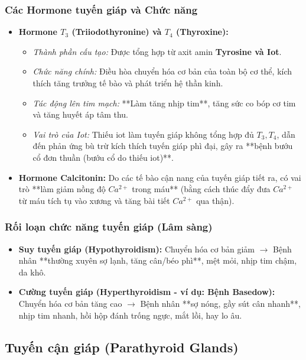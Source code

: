 \subsubsection{Các Hormone tuyến giáp và Chức năng}
\begin{itemize}
    \item \textbf{Hormone $T_3$ (Triiodothyronine) và $T_4$ (Thyroxine):}
    \begin{itemize}
        \item \textit{Thành phần cấu tạo:} Được tổng hợp từ axit amin \textbf{Tyrosine và Iot}.
        \item \textit{Chức năng chính:} Điều hòa chuyển hóa cơ bản của toàn bộ cơ thể, kích thích tăng trưởng tế bào và phát triển hệ thần kinh.
        \item \textit{Tác động lên tim mạch:} **Làm tăng nhịp tim**, tăng sức co bóp cơ tim và tăng huyết áp tâm thu.
        \item \textit{Vai trò của Iot:} Thiếu iot làm tuyến giáp không tổng hợp đủ $T_3, T_4$, dẫn đến phản ứng bù trừ kích thích tuyến giáp phì đại, gây ra **bệnh bướu cổ đơn thuần (bướu cổ do thiếu iot)**.
    \end{itemize}

    \item \textbf{Hormone Calcitonin:} Do các tế bào cận nang của tuyến giáp tiết ra, có vai trò **làm giảm nồng độ $Ca^{2+}$ trong máu** (bằng cách thúc đẩy đưa $Ca^{2+}$ từ máu tích tụ vào xương và tăng bài tiết $Ca^{2+}$ qua thận).
\end{itemize}

\subsubsection{Rối loạn chức năng tuyến giáp (Lâm sàng)}
\begin{itemize}
    \item \textbf{Suy tuyến giáp (Hypothyroidism):} Chuyển hóa cơ bản giảm $\rightarrow$ Bệnh nhân **thường xuyên sợ lạnh, tăng cân/béo phì**, mệt mỏi, nhịp tim chậm, da khô.
    \item \textbf{Cường tuyến giáp (Hyperthyroidism - ví dụ: Bệnh Basedow):} Chuyển hóa cơ bản tăng cao $\rightarrow$ Bệnh nhân **sợ nóng, gầy sút cân nhanh**, nhịp tim nhanh, hồi hộp đánh trống ngực, mắt lồi, hay lo âu.
\end{itemize}

\subsection{Tuyến cận giáp (Parathyroid Glands)}

